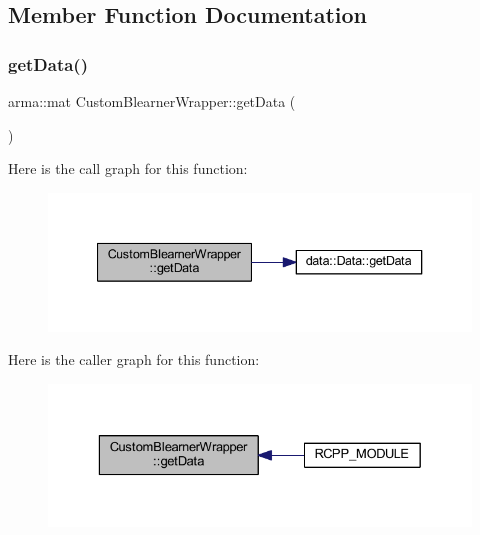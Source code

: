 \subsection{Member Function Documentation}
\mbox{\label{class_custom_blearner_wrapper_a3153378a0c0ee8c4633d42680195eeda}} 
\subsubsection{\texorpdfstring{get\+Data()}{getData()}}
{\footnotesize\ttfamily arma\+::mat Custom\+Blearner\+Wrapper\+::get\+Data (\begin{DoxyParamCaption}{ }\end{DoxyParamCaption})\hspace{0.3cm}{\ttfamily [inline]}}

Here is the call graph for this function\+:
\nopagebreak
\begin{figure}[H]
\begin{center}
\leavevmode
\includegraphics[width=340pt]{class_custom_blearner_wrapper_a3153378a0c0ee8c4633d42680195eeda_cgraph}
\end{center}
\end{figure}
Here is the caller graph for this function\+:\nopagebreak
\begin{figure}[H]
\begin{center}
\leavevmode
\includegraphics[width=329pt]{class_custom_blearner_wrapper_a3153378a0c0ee8c4633d42680195eeda_icgraph}
\end{center}
\end{figure}
\mbox{\label{class_custom_blearner_wrapper_ae012429cb317fae84ab8028c76c2b70d}} 
